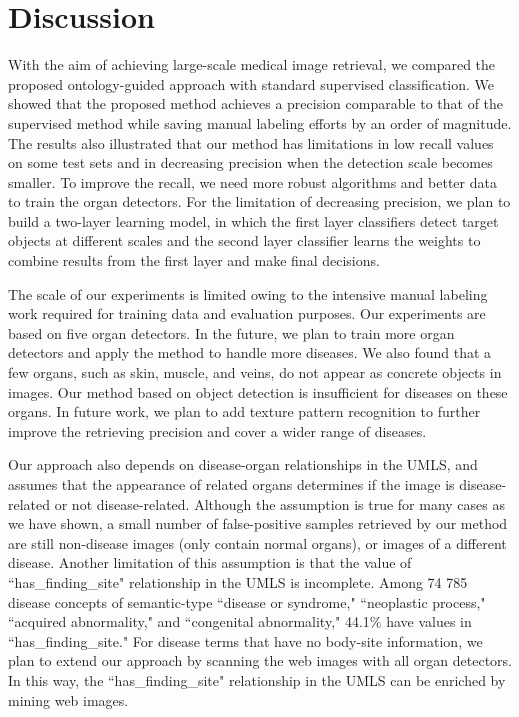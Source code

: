 \section{Discussion}
With the aim of achieving large-scale medical image retrieval,
we compared the proposed ontology-guided approach with
standard supervised classification. We showed that the proposed
method achieves a precision comparable to that of the supervised
method while saving manual labeling efforts by an order
of magnitude. The results also illustrated that our method has
limitations in low recall values on some test sets and in decreasing
precision when the detection scale becomes smaller. To
improve the recall, we need more robust algorithms and better
data to train the organ detectors. For the limitation of decreasing
precision, we plan to build a two-layer learning model, in
which the first layer classifiers detect target objects at different
scales and the second layer classifier learns the weights to
combine results from the first layer and make final decisions.

The scale of our experiments is limited owing to the intensive
manual labeling work required for training data and evaluation
purposes. Our experiments are based on five organ detectors. In
the future, we plan to train more organ detectors and apply the
method to handle more diseases. We also found that a few
organs, such as skin, muscle, and veins, do not appear as concrete
objects in images. Our method based on object detection
is insufficient for diseases on these organs. In future work, we
plan to add texture pattern recognition to further improve the
retrieving precision and cover a wider range of diseases.

Our approach also depends on disease-organ relationships in
the UMLS, and assumes that the appearance of related organs
determines if the image is disease-related or not disease-related.
Although the assumption is true for many cases as we have
shown, a small number of false-positive samples retrieved by
our method are still non-disease images (only contain normal
organs), or images of a different disease. Another limitation of
this assumption is that the value of ``has\_finding\_site" relationship
in the UMLS is incomplete. Among 74 785 disease concepts
of semantic-type ``disease or syndrome," ``neoplastic
process," ``acquired abnormality," and ``congenital abnormality,"
44.1\% have values in ``has\_finding\_site." For disease terms that
have no body-site information, we plan to extend our approach
by scanning the web images with all organ detectors. In this
way, the ``has\_finding\_site" relationship in the UMLS can be
enriched by mining web images.

